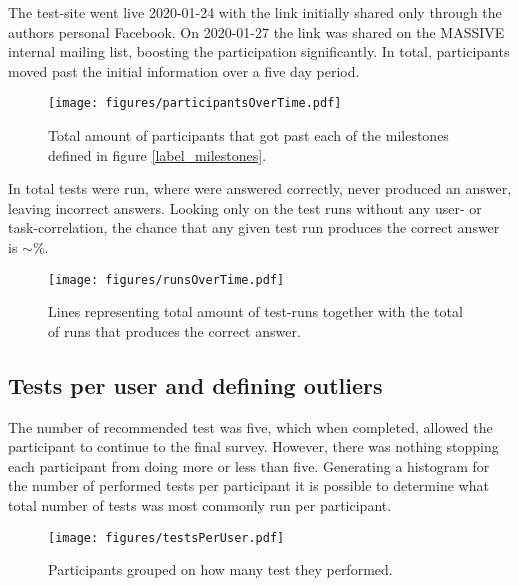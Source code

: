     The test-site went live 2020-01-24 with the link initially shared only
    through the authors personal Facebook. On 2020-01-27 the link was shared on
    the MASSIVE internal mailing list, boosting the participation
    significantly. In total,  participants moved
    past the initial information over a five day period.

    \begin{figure}[h!]
      \centering
      \texttt{[image: figures/participantsOverTime.pdf]}
      \caption{
        Total amount of participants that got past each of the milestones
        defined in figure \ref{label_milestones}.
      }
    \end{figure}

    In total  tests were run, where
     were answered correctly,
     never produced an answer, leaving
     incorrect answers. Looking only on the test
    runs without any user- or task-correlation, the chance that any given test run
    produces the correct answer is $\sim$\%.

    \begin{figure}[h!]
      \centering
      \texttt{[image: figures/runsOverTime.pdf]}
      \caption{Lines representing total amount of test-runs together with
        the total of runs that produces the correct answer.}
    \end{figure}

  \subsection{Tests per user and defining outliers}

    The number of recommended test was five, which when completed, allowed
    the participant to continue to the final survey. However, there was
    nothing stopping each participant from doing more or less than five.
    Generating a histogram for the number of performed tests per
    participant it is possible to determine what total number of tests was most
    commonly run per participant.

    \begin{figure}[h!]
      \centering
      \texttt{[image: figures/testsPerUser.pdf]}
      \caption{Participants grouped on how many test they performed.}
    \end{figure}

